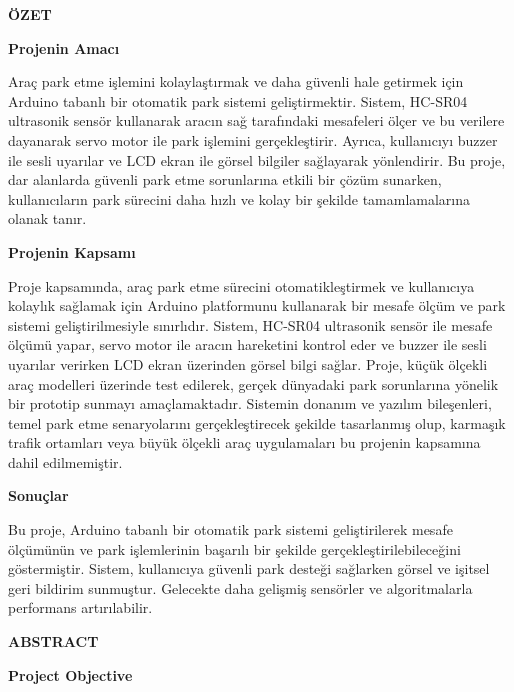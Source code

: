 \centerline{\bf ÖZET}
\begin{center}
\textbf{Projenin Amacı}
\end{center} 
 \begin{minipage}{\linewidth}
     
     Araç park etme işlemini kolaylaştırmak ve daha güvenli hale getirmek için Arduino tabanlı bir otomatik park sistemi geliştirmektir. Sistem, HC-SR04 ultrasonik sensör kullanarak aracın sağ tarafındaki mesafeleri ölçer ve bu verilere dayanarak servo motor ile park işlemini gerçekleştirir. Ayrıca, kullanıcıyı buzzer ile sesli uyarılar ve LCD ekran ile görsel bilgiler sağlayarak yönlendirir. Bu proje, dar alanlarda güvenli park etme sorunlarına etkili bir çözüm sunarken, kullanıcıların park sürecini daha hızlı ve kolay bir şekilde tamamlamalarına olanak tanır.
     
\end{minipage}
\vspace{1cm}
\begin{center}
\textbf{Projenin Kapsamı}
\end{center}
  \begin{minipage}{\linewidth}
     
     Proje kapsamında, araç park etme sürecini otomatikleştirmek ve kullanıcıya kolaylık sağlamak için Arduino platformunu kullanarak bir mesafe ölçüm ve park sistemi geliştirilmesiyle sınırlıdır. Sistem, HC-SR04 ultrasonik sensör ile mesafe ölçümü yapar, servo motor ile aracın hareketini kontrol eder ve buzzer ile sesli uyarılar verirken LCD ekran üzerinden görsel bilgi sağlar. Proje, küçük ölçekli araç modelleri üzerinde test edilerek, gerçek dünyadaki park sorunlarına yönelik bir prototip sunmayı amaçlamaktadır. Sistemin donanım ve yazılım bileşenleri, temel park etme senaryolarını gerçekleştirecek şekilde tasarlanmış olup, karmaşık trafik ortamları veya büyük ölçekli araç uygulamaları bu projenin kapsamına dahil edilmemiştir.
     
 \end{minipage}
\vspace{1cm}
\begin{center}
\textbf{Sonuçlar}
\end{center}
\begin{minipage}{\linewidth}
    
    Bu proje, Arduino tabanlı bir otomatik park sistemi geliştirilerek mesafe ölçümünün ve park işlemlerinin başarılı bir şekilde gerçekleştirilebileceğini göstermiştir. Sistem, kullanıcıya güvenli park desteği sağlarken görsel ve işitsel geri bildirim sunmuştur. Gelecekte daha gelişmiş sensörler ve algoritmalarla performans artırılabilir.
    
\end{minipage}
\newpage
\centerline{\bf ABSTRACT}
\begin{center}
\textbf{Project Objective}
\end{center}


